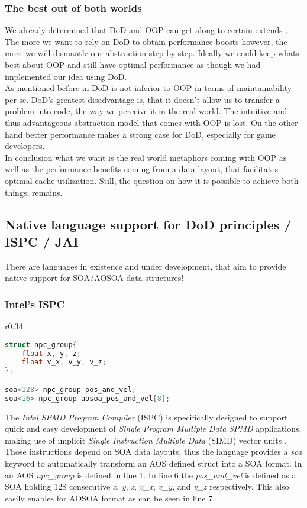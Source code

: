 \subsubsection{The best out of both worlds}
We already determined that DoD and OOP can get along to certain extends . The more we want to rely on DoD to obtain performance boosts however, the more we will dismantle our abstraction step by step. Ideally we could keep whats best about OOP and still have optimal performance as though we had implemented our idea using DoD.\\
As mentioned before in  DoD is not inferior to OOP in terms of maintainability per se. DoD's greatest disadvantage is, that it doesn't allow us to transfer a problem into code, the way we perceive it in the real world. The intuitive and thus advantageous abstraction model that comes with OOP is lost. On the other hand better performance makes a strong case for DoD, especially for game developers.\\
In conclusion what we want is the real world metaphors coming with OOP as well as the performance benefits coming from a data layout, that facilitates optimal cache utilization. Still, the question on how it is possible to achieve both things, remains.

\subsection{Native language support for DoD principles / ISPC / JAI}\label{nat_lan_sup}
There are languages in existence and under development, that aim to provide native support for SOA/AOSOA data structures!

\subsubsection{Intel's ISPC}
\begin{wrapfigure}[11]{r}{0.34\textwidth}
\begin{lstlisting}[language=C++,name={ISPC's native SOA support},morekeywords={soa}, label={ispc_npc}]
struct npc_group{
	float x, y, z;
	float v_x, v_y, v_z;
};

soa<128> npc_group pos_and_vel;
soa<16> npc_group aosoa_pos_and_vel[8];
\end{lstlisting}
\end{wrapfigure}
The \textit{Intel SPMD Program Compiler} (ISPC) is specifically designed to support quick and easy development of \textit{Single Program Multiple Data} \textit{SPMD} applications, making use of implicit \textit{Single Instruction Multiple Data} (SIMD) vector units .\\
Those instructions depend on SOA data layouts, thus the language provides a \textit{soa} keyword to automatically transform an AOS defined struct into a SOA format. In  an AOS \textit{npc\_group} is defined in line 1. In line 6 the \textit{pos\_and\_vel} is defined as a SOA holding 128 consecutive \textit{x}, \textit{y}, \textit{z}, \textit{v\_x}, \textit{v\_y}, and \textit{v\_z} respectively. This also easily enables for AOSOA format as can be seen in line 7.

